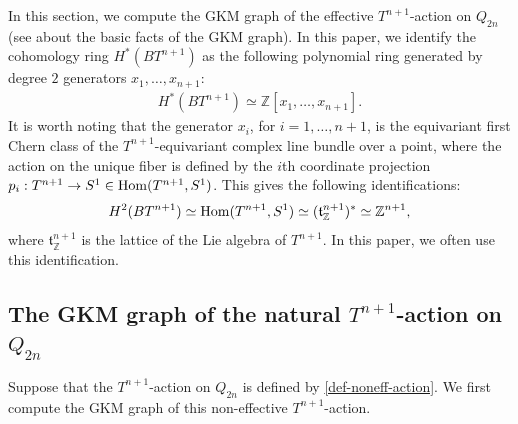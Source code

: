 \documentclass[12pt]{amsart}
\theoremstyle{remark}
\numberwithin{equation}{section}
\newcommand{\algt}{\mathfrak{t}}
\begin{document}
In this section, 
we compute the GKM graph of the effective $T^{n+1}$-action on $Q_{2n}$ (see \cite{GZ01, Ku09} about the basic facts of the GKM graph). 
In this paper, we identify the cohomology ring $H^{*}(BT^{n+1})$ as the following polynomial ring generated by degree $2$ generators $x_{1},\ldots, x_{n+1}$:
\begin{align}
\label{generators_of_BT}
H^{*}(BT^{n+1})\simeq \mathbb{Z}[x_{1},\ldots, x_{n+1}].
\end{align}
It is worth noting that the generator $x_{i}$, for $i=1,\ldots, n+1$, is 
the equivariant first Chern class of the $T^{n+1}$-equivariant complex line bundle over a point, where the action on the unique fiber is defined by the $i$th coordinate projection $p_{i}:T^{n+1}\to S^{1}\in {\rm Hom}(T^{n+1},S^{1})$.
This gives the following identifications:
\begin{align*}
H^{2}(BT^{n+1})\simeq {\rm Hom}(T^{n+1},S^{1})\simeq(\algt_{\mathbb{Z}}^{n+1})^{*}\simeq \mathbb{Z}^{n+1},
\end{align*} 
where $\mathfrak{t}_{\mathbb{Z}}^{n+1}$ is the lattice of the Lie algebra of $T^{n+1}$.
In this paper, we often use this identification.


\subsection{The GKM graph of the natural $T^{n+1}$-action on $Q_{2n}$} %
\label{sect:2.1}

Suppose that the $T^{n+1}$-action on $Q_{2n}$ is defined by \eqref{def-noneff-action}.
We first compute the GKM graph of this non-effective $T^{n+1}$-action.
\end{document}
